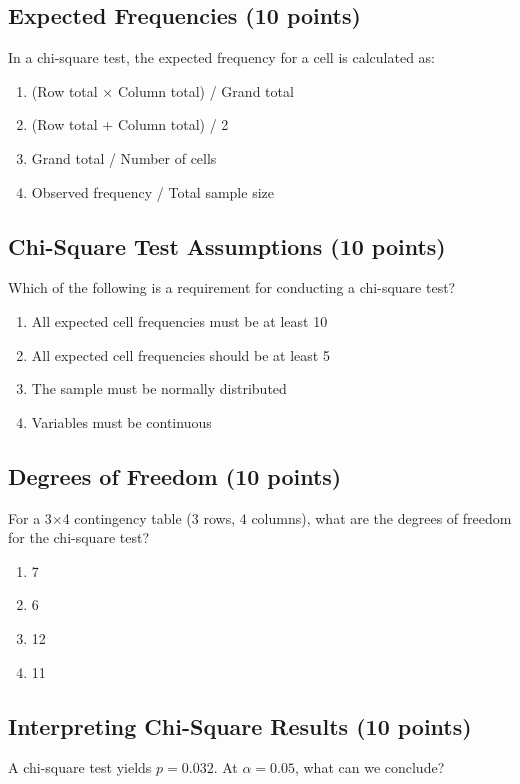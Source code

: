 \documentclass[11pt]{article}
\begin{document}
\subsection*{Expected Frequencies (10 points)}
In a chi-square test, the expected frequency for a cell is calculated as:

\begin{enumerate}[label=\Alph*.]
\item (Row total × Column total) / Grand total
\item (Row total + Column total) / 2
\item Grand total / Number of cells
\item Observed frequency / Total sample size
\end{enumerate}

\subsection*{Chi-Square Test Assumptions (10 points)}
Which of the following is a requirement for conducting a chi-square test?

\begin{enumerate}[label=\Alph*.]
\item All expected cell frequencies must be at least 10
\item All expected cell frequencies should be at least 5
\item The sample must be normally distributed
\item Variables must be continuous
\end{enumerate}

\subsection*{Degrees of Freedom (10 points)}
For a 3×4 contingency table (3 rows, 4 columns), what are the degrees of freedom for the chi-square test?

\begin{enumerate}[label=\Alph*.]
\item 7
\item 6
\item 12
\item 11
\end{enumerate}

\subsection*{Interpreting Chi-Square Results (10 points)}
A chi-square test yields $p = 0.032$. At $\alpha = 0.05$, what can we conclude?
\end{document}
